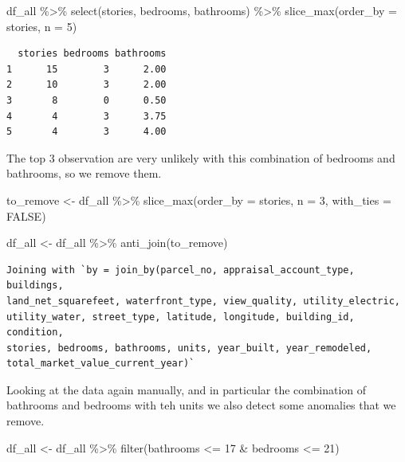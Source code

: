 \documentclass[
  english,
  letterpaper,
  DIV=11,
  numbers=noendperiod]{scrreprt}
\newenvironment{Shaded}{\begin{snugshade}}{\end{snugshade}}
\newcommand{\AttributeTok}[1]{\textcolor[rgb]{0.40,0.45,0.13}{#1}}
\newcommand{\ConstantTok}[1]{\textcolor[rgb]{0.56,0.35,0.01}{#1}}
\newcommand{\DecValTok}[1]{\textcolor[rgb]{0.68,0.00,0.00}{#1}}
\newcommand{\FunctionTok}[1]{\textcolor[rgb]{0.28,0.35,0.67}{#1}}
\newcommand{\NormalTok}[1]{\textcolor[rgb]{0.00,0.23,0.31}{#1}}
\newcommand{\OtherTok}[1]{\textcolor[rgb]{0.00,0.23,0.31}{#1}}
\newcommand{\SpecialCharTok}[1]{\textcolor[rgb]{0.37,0.37,0.37}{#1}}
\begin{document}
\begin{Shaded}
\begin{Highlighting}[]
\NormalTok{df\_all }\SpecialCharTok{\%\textgreater{}\%}
  \FunctionTok{select}\NormalTok{(stories, bedrooms, bathrooms) }\SpecialCharTok{\%\textgreater{}\%}  
  \FunctionTok{slice\_max}\NormalTok{(}\AttributeTok{order\_by =}\NormalTok{ stories, }\AttributeTok{n =} \DecValTok{5}\NormalTok{)}
\end{Highlighting}
\end{Shaded}

\begin{verbatim}
  stories bedrooms bathrooms
1      15        3      2.00
2      10        3      2.00
3       8        0      0.50
4       4        3      3.75
5       4        3      4.00
\end{verbatim}

The top 3 observation are very unlikely with this combination of
bedrooms and bathrooms, so we remove them.

\begin{Shaded}
\begin{Highlighting}[]
\NormalTok{to\_remove }\OtherTok{\textless{}{-}}\NormalTok{ df\_all }\SpecialCharTok{\%\textgreater{}\%}
  \FunctionTok{slice\_max}\NormalTok{(}\AttributeTok{order\_by =}\NormalTok{ stories, }\AttributeTok{n =} \DecValTok{3}\NormalTok{, }\AttributeTok{with\_ties =} \ConstantTok{FALSE}\NormalTok{)}

\NormalTok{df\_all }\OtherTok{\textless{}{-}}\NormalTok{ df\_all }\SpecialCharTok{\%\textgreater{}\%}
  \FunctionTok{anti\_join}\NormalTok{(to\_remove)}
\end{Highlighting}
\end{Shaded}

\begin{verbatim}
Joining with `by = join_by(parcel_no, appraisal_account_type, buildings,
land_net_squarefeet, waterfront_type, view_quality, utility_electric,
utility_water, street_type, latitude, longitude, building_id, condition,
stories, bedrooms, bathrooms, units, year_built, year_remodeled,
total_market_value_current_year)`
\end{verbatim}

Looking at the data again manually, and in particular the combination of
bathrooms and bedrooms with teh units we also detect some anomalies that
we remove.

\begin{Shaded}
\begin{Highlighting}[]
\NormalTok{df\_all }\OtherTok{\textless{}{-}}\NormalTok{ df\_all }\SpecialCharTok{\%\textgreater{}\%}
  \FunctionTok{filter}\NormalTok{(bathrooms }\SpecialCharTok{\textless{}=} \DecValTok{17} \SpecialCharTok{\&}\NormalTok{ bedrooms }\SpecialCharTok{\textless{}=} \DecValTok{21}\NormalTok{)}
\end{Highlighting}
\end{Shaded}
\end{document}
